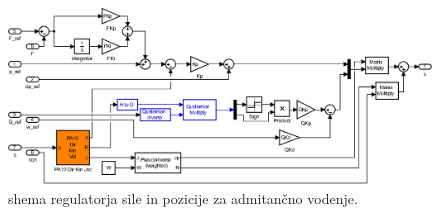 \begin{figure}[!h]
	\centering
	\includegraphics[width=\textwidth]{./Slike/admitance_control.eps}
	\caption{\simulink shema regulatorja sile in pozicije za admitan\v{c}no vodenje.}
	\label{fig:admitance_control}
\end{figure}
